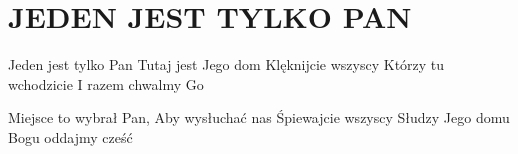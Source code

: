 \documentclass[../../../songbook.tex]{subfiles}
\begin{document}
\TabPositions{8cm} %
\section*{JEDEN JEST TYLKO PAN}
{}
\vspace{0.5cm}
Jeden jest tylko Pan	 \newline	
Tutaj jest Jego dom		 \newline	
Klęknijcie wszyscy 		 \newline	
Którzy tu wchodzicie	 \newline	
I razem chwalmy Go		 \newline	

Miejsce to wybrał Pan,  \newline	
Aby wysłuchać nas \newline	
Śpiewajcie wszyscy  \newline	
Słudzy Jego domu \newline	
Bogu oddajmy cześć \newline	
\end{document}
